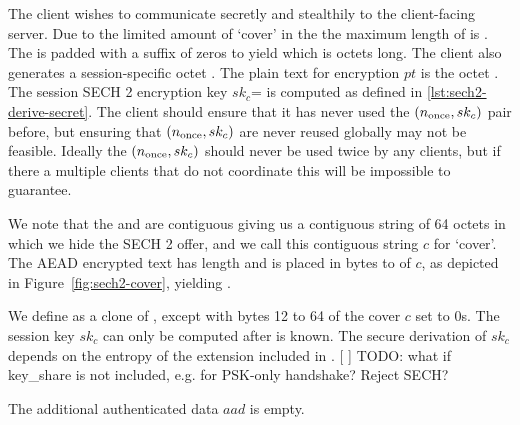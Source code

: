 The client wishes to communicate  secretly and stealthily to the client-facing server. Due to the limited amount of `cover' in the  the maximum length of  is \sechtwoservernamelen. The  is padded with a suffix of zeros to yield  which is \sechtwoservernamelen octets long.  The client also generates a session-specific \sechtwoivlen{} octet \nonce. The plain text for encryption $pt$ is the \sechtwoservernamelen{} octet .
The session SECH 2 encryption key $sk_c$= is computed as defined in \ref{lst:sech2-derive-secret}.
The client should ensure that it has never used the $(\nonce,sk_c)$ pair before, but ensuring that $(\nonce,sk_c)$ are never reused globally may not be feasible. Ideally the $(\nonce,sk_c)$ should never be used twice by any clients, but if there a multiple clients that do not coordinate this will be impossible to guarantee.


We note that the  and  are contiguous giving us a contiguous string of 64 octets in which we hide the SECH 2 offer, and we call this contiguous string $c$ for `cover'. The AEAD encrypted text has length \sechtwocipherlen{} and is placed in bytes \sechtwocipheroffset{}  to \sechtwocipherend{} of $c$, as depicted in Figure~\ref{fig:sech2-cover}, yielding \var{\ClientHelloOuter}.

We define  as a clone of , except with bytes 12 to 64 of the cover $c$ set to 0s. The session key $sk_c$ can only be computed after  is known.
The secure derivation of $sk_c$ depends on the entropy of the  extension included in .
[ ] TODO: what if key\_share is not included, e.g. for PSK-only handshake? Reject SECH?

The additional authenticated data $aad$ is empty.


